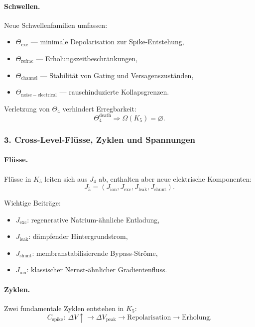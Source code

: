 \paragraph{Schwellen.}
Neue Schwellenfamilien umfassen:
\begin{itemize}
  \item $\Theta_{\mathrm{exc}}$ — minimale Depolarisation zur Spike-Entstehung,
  \item $\Theta_{\mathrm{refrac}}$ — Erholungszeitbeschränkungen,
  \item $\Theta_{\mathrm{channel}}$ — Stabilität von Gating und Versagenszuständen,
  \item $\Theta_{\mathrm{noise-electrical}}$ — rauschinduzierte Kollapsgrenzen.
\end{itemize}

Verletzung von $\Theta_4$ verhindert Erregbarkeit:
\[
\Theta_4^{\mathrm{death}} \Rightarrow \Omega(K_5)=\varnothing.
\]

\subsubsection{3. Cross-Level-Flüsse, Zyklen und Spannungen}

\paragraph{Flüsse.}
Flüsse in $K_5$ leiten sich aus $J_4$ ab, enthalten aber neue elektrische
Komponenten:
\[
J_5 = (J_{\mathrm{ion}}, J_{\mathrm{exc}}, J_{\mathrm{leak}}, J_{\mathrm{shunt}}).
\]

Wichtige Beiträge:
\begin{itemize}
  \item \textbf{$J_{\mathrm{exc}}$}: regenerative Natrium-ähnliche Entladung,
  \item \textbf{$J_{\mathrm{leak}}$}: dämpfender Hintergrundstrom,
  \item \textbf{$J_{\mathrm{shunt}}$}: membranstabilisierende Bypass-Ströme,
  \item \textbf{$J_{\mathrm{ion}}$}: klassischer Nernst-ähnlicher Gradientenfluss.
\end{itemize}

\paragraph{Zyklen.}
Zwei fundamentale Zyklen entstehen in $K_5$:
\[
C_{\mathrm{spike}}:\ \Delta V \uparrow \rightarrow \Delta V_{\mathrm{peak}}
\rightarrow \text{Repolarisation} \rightarrow \text{Erholung}.
\]


